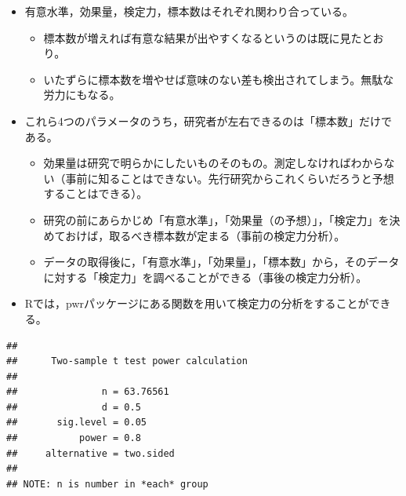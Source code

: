 \documentclass[]{article}
\newenvironment{Shaded}{\begin{snugshade}}{\end{snugshade}}
\newcommand{\KeywordTok}[1]{\textcolor[rgb]{0.13,0.29,0.53}{\textbf{#1}}}
\newcommand{\DataTypeTok}[1]{\textcolor[rgb]{0.13,0.29,0.53}{#1}}
\newcommand{\FloatTok}[1]{\textcolor[rgb]{0.00,0.00,0.81}{#1}}
\newcommand{\CommentTok}[1]{\textcolor[rgb]{0.56,0.35,0.01}{\textit{#1}}}
\newcommand{\OtherTok}[1]{\textcolor[rgb]{0.56,0.35,0.01}{#1}}
\newcommand{\OperatorTok}[1]{\textcolor[rgb]{0.81,0.36,0.00}{\textbf{#1}}}
\newcommand{\NormalTok}[1]{#1}
\providecommand{\tightlist}{%
  \setlength{\itemsep}{0pt}\setlength{\parskip}{0pt}}
\begin{document}
\begin{itemize}
\tightlist
\item
  有意水準，効果量，検定力，標本数はそれぞれ関わり合っている。

  \begin{itemize}
  \tightlist
  \item
    標本数が増えれば有意な結果が出やすくなるというのは既に見たとおり。
  \item
    いたずらに標本数を増やせば意味のない差も検出されてしまう。無駄な労力にもなる。
  \end{itemize}
\item
  これら4つのパラメータのうち，研究者が左右できるのは「標本数」だけである。

  \begin{itemize}
  \tightlist
  \item
    効果量は研究で明らかにしたいものそのもの。測定しなければわからない（事前に知ることはできない。先行研究からこれくらいだろうと予想することはできる）。
  \item
    研究の前にあらかじめ「有意水準」，「効果量（の予想）」，「検定力」を決めておけば，取るべき標本数が定まる（事前の検定力分析）。
  \item
    データの取得後に，「有意水準」，「効果量」，「標本数」から，そのデータに対する「検定力」を調べることができる（事後の検定力分析）。
  \end{itemize}
\item
  Rでは，pwrパッケージにある関数を用いて検定力の分析をすることができる。
\end{itemize}

\begin{Shaded}
\end{Shaded}

\begin{verbatim}
## 
##      Two-sample t test power calculation 
## 
##               n = 63.76561
##               d = 0.5
##       sig.level = 0.05
##           power = 0.8
##     alternative = two.sided
## 
## NOTE: n is number in *each* group
\end{verbatim}
\end{document}
